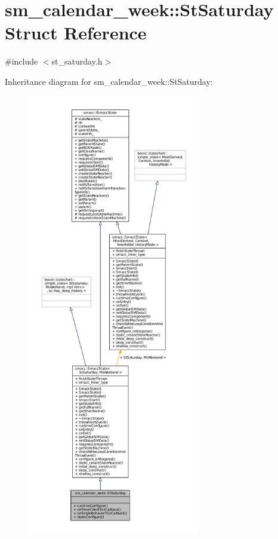 \hypertarget{structsm__calendar__week_1_1StSaturday}{}\section{sm\+\_\+calendar\+\_\+week\+:\+:St\+Saturday Struct Reference}
\label{structsm__calendar__week_1_1StSaturday}


{\ttfamily \#include $<$st\+\_\+saturday.\+h$>$}



Inheritance diagram for sm\+\_\+calendar\+\_\+week\+:\+:St\+Saturday\+:
\nopagebreak
\begin{figure}[H]
\begin{center}
\leavevmode
\includegraphics[height=550pt]{structsm__calendar__week_1_1StSaturday__inherit__graph}
\end{center}
\end{figure}


